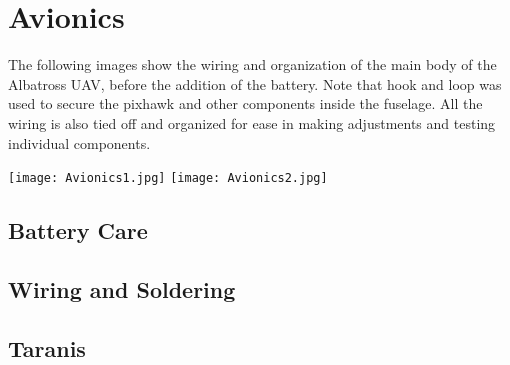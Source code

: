 \documentclass{article}
\begin{document}
\section{Avionics}
The following images show the wiring and organization of the main body of the Albatross UAV, before the addition of the battery. Note that hook and loop was used to secure the pixhawk and other components inside the fuselage. All the wiring is also tied off and organized for ease in making adjustments and testing individual components.\newline 

\begin{center}
\texttt{[image: Avionics1.jpg]} \newline
\texttt{[image: Avionics2.jpg]}


\end{center}

\subsection{Battery Care}
\subsection{Wiring and Soldering}
\subsection{Taranis}



\clearpage
\end{document}
